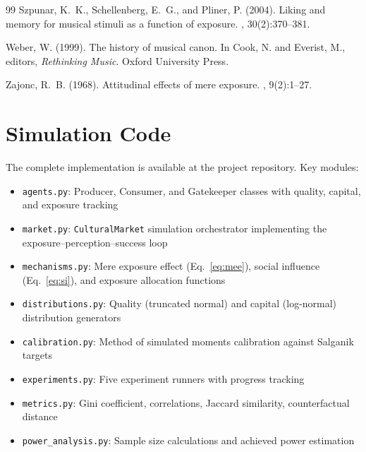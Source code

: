 \documentclass[11pt,a4paper]{article}
\begin{document}
\begin{thebibliography}{99}
Szpunar, K.~K., Schellenberg, E.~G., and Pliner, P. (2004).
\newblock Liking and memory for musical stimuli as a function of exposure.
, 30(2):370--381.

Weber, W. (1999).
\newblock The history of musical canon.
\newblock In Cook, N. and Everist, M., editors, {\em Rethinking Music}. Oxford University Press.

Zajonc, R.~B. (1968).
\newblock Attitudinal effects of mere exposure.
, 9(2):1--27.

\end{thebibliography}



\appendix

\section{Simulation Code}
\label{app:code}

The complete implementation is available at the project repository. Key modules:

\begin{itemize}
    \item \texttt{agents.py}: Producer, Consumer, and Gatekeeper classes with quality, capital, and exposure tracking
    \item \texttt{market.py}: \texttt{CulturalMarket} simulation orchestrator implementing the exposure--perception--success loop
    \item \texttt{mechanisms.py}: Mere exposure effect (Eq.~\ref{eq:mee}), social influence (Eq.~\ref{eq:si}), and exposure allocation functions
    \item \texttt{distributions.py}: Quality (truncated normal) and capital (log-normal) distribution generators
    \item \texttt{calibration.py}: Method of simulated moments calibration against Salganik targets
    \item \texttt{experiments.py}: Five experiment runners with progress tracking
    \item \texttt{metrics.py}: Gini coefficient, correlations, Jaccard similarity, counterfactual distance
    \item \texttt{power\_analysis.py}: Sample size calculations and achieved power estimation
\end{itemize}
\end{document}
